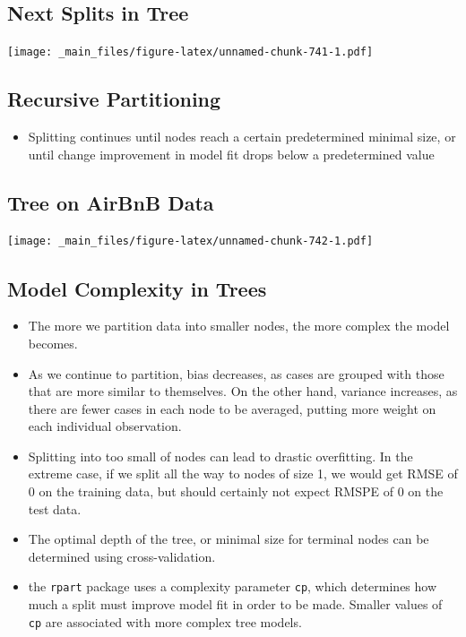 \documentclass[]{book}
\providecommand{\tightlist}{%
  \setlength{\itemsep}{0pt}\setlength{\parskip}{0pt}}
\begin{document}
\subsection{Next Splits in Tree}\label{next-splits-in-tree}

\texttt{[image: \_main\_files/figure-latex/unnamed-chunk-741-1.pdf]}

\subsection{Recursive Partitioning}\label{recursive-partitioning}

\begin{itemize}
\tightlist
\item
  Splitting continues until nodes reach a certain predetermined minimal
  size, or until change improvement in model fit drops below a
  predetermined value
\end{itemize}

\subsection{Tree on AirBnB Data}\label{tree-on-airbnb-data}

\texttt{[image: \_main\_files/figure-latex/unnamed-chunk-742-1.pdf]}

\subsection{Model Complexity in Trees}\label{model-complexity-in-trees}

\begin{itemize}
\item
  The more we partition data into smaller nodes, the more complex the
  model becomes.
\item
  As we continue to partition, bias decreases, as cases are grouped with
  those that are more similar to themselves. On the other hand, variance
  increases, as there are fewer cases in each node to be averaged,
  putting more weight on each individual observation.
\item
  Splitting into too small of nodes can lead to drastic overfitting. In
  the extreme case, if we split all the way to nodes of size 1, we would
  get RMSE of 0 on the training data, but should certainly not expect
  RMSPE of 0 on the test data.
\item
  The optimal depth of the tree, or minimal size for terminal nodes can
  be determined using cross-validation.
\item
  the \texttt{rpart} package uses a complexity parameter \texttt{cp},
  which determines how much a split must improve model fit in order to
  be made. Smaller values of \texttt{cp} are associated with more
  complex tree models.
\end{itemize}
\end{document}
